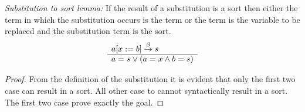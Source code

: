 \begin{lemma}
    \label{SubstitutionToSort}
    \emph{Substitution to sort lemma:}
    If the result of a substitution is a sort then either the term in
    which the substitution occurs is the term or the term is the variable to be
    replaced and the substitution term is the sort.
    $$
        \begin{array}{l} 
            a[x:=b] \stackrel{\beta}{\to} s
         \\ \hline 
            a = s \lor (a = x \land b = s)
        \end{array}
    $$
    \begin{proof}
        From the definition of the substitution it is evident that only the
        first two case can result in a sort. All other case to cannot
        syntactically result in a sort. The first two case prove exactly the
        goal.
    \end{proof}
\end{lemma}


